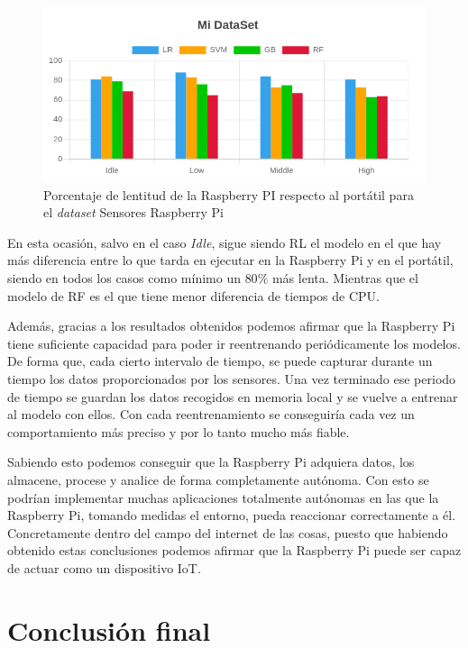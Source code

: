 \documentclass[a4paper, 12pt]{book}
\begin{document}
\begin{figure}[]
  \centering
  \includegraphics[width=14cm, keepaspectratio]{img/per_mi.png}
  \caption{Porcentaje de lentitud de la Raspberry PI respecto al portátil para el \textit{dataset} Sensores Raspberry Pi}
  \label{fig:per_Mi}
\end{figure}

En esta ocasión, salvo en el caso \textit{Idle}, sigue siendo RL el modelo en el que hay más diferencia entre lo que tarda en ejecutar en la Raspberry Pi y en el portátil, siendo en todos los casos como mínimo un $80\%$ más lenta. Mientras que el modelo de RF es el que tiene menor diferencia de tiempos de CPU.

Además, gracias a los resultados obtenidos podemos afirmar que la Raspberry Pi tiene suficiente capacidad para poder ir reentrenando periódicamente los modelos. De forma que, cada cierto intervalo de tiempo, se puede capturar durante un tiempo los datos proporcionados por los sensores. Una vez terminado ese periodo de tiempo se guardan los datos recogidos en memoria local y se vuelve a entrenar al modelo con ellos. Con cada reentrenamiento se conseguiría cada vez un comportamiento más preciso y por lo tanto mucho más fiable.

Sabiendo esto podemos conseguir que la Raspberry Pi adquiera datos, los almacene, procese y analice de forma completamente autónoma. Con esto se podrían implementar muchas aplicaciones totalmente autónomas en las que la Raspberry Pi, tomando medidas el entorno, pueda reaccionar correctamente a él. Concretamente dentro del campo del internet de las cosas, puesto que habiendo obtenido estas conclusiones podemos afirmar que la Raspberry Pi puede ser capaz de actuar como un dispositivo IoT.


\section{Conclusión final}
\label{sec:conclusion_final}
\end{document}
